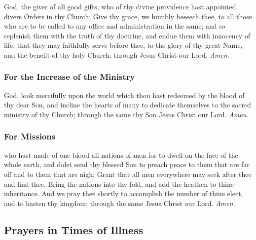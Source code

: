 God, the giver of all good gifts, who of thy divine providence hast appointed divers Orders in thy Church; Give thy grace, we humbly beseech thee, to all those who are to be called to any office and administration in the same; and so replenish them with the truth of thy doctrine, and endue them with innocency of life, that they may faithfully serve before thee, to the glory of thy great Name, and the benefit of thy holy Church; through Jesus Christ our Lord. \textit{Amen.}


\subsubsection{For the Increase of the Ministry}

 God, look mercifully upon the world which thou hast redeemed by the blood of thy dear Son, and incline the hearts of many to dedicate themselves to the sacred ministry of thy Church; through the same thy Son Jesus Christ our Lord. \textit{Amen.}

\subsubsection{For Missions}

 who hast made of one blood all nations of men for to dwell on the face of the whole earth, and didst send thy blessed Son to preach peace to them that are far off and to them that are nigh; Grant that all men everywhere may seek after thee and find thee. Bring the nations into thy fold, and add the heathen to thine inheritance. And we pray thee shortly to accomplish the number of thine elect, and to hasten thy kingdom; through the same Jesus Christ our Lord. \textit{Amen.}



\clearpage
\subsection{Prayers in Times of Illness}

